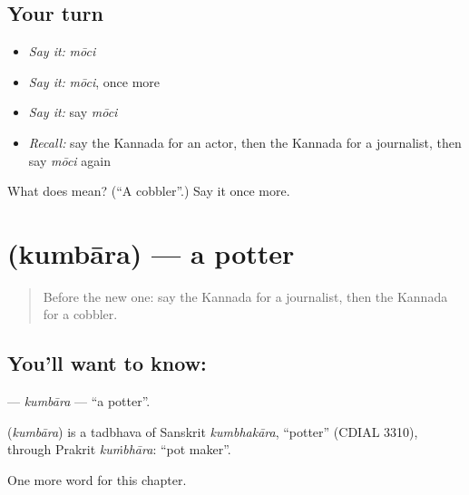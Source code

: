 \subsection*{Your turn}
\begin{itemize}
\raggedright
  \item \emph{Say it:} \emph{mōci}
  \item \emph{Say it:} \emph{mōci}, once more
  \item \emph{Say it:} say \emph{mōci}
  \item \emph{Recall:} say the Kannada for an actor, then the Kannada for a journalist, then say \emph{mōci} again
\end{itemize}

\begin{tcolorbox}[breakable,colback=teal!4,colframe=teal!35!black,title={Before you move on}]
What does  mean? (\textquotedblleft{}A cobbler\textquotedblright{}.) Say it once more.
\end{tcolorbox}
\section[\texorpdfstring{\kn{ಕುಂಬಾರ} (kumbāra)}{ಕುಂಬಾರ (kumbāra)}]{ (kumbāra) — a potter}

\label{lesson:KA-C306-kumbara}



\begin{quote}
Before the new one: say the Kannada for a journalist, then the Kannada for a cobbler.
\end{quote}

\subsection*{You'll want to know: }
\textbf{} — \emph{kumbāra} — \textquotedblleft{}a potter\textquotedblright{}.

\begin{cousinweb}
\textbf{} (\emph{kumbāra}) is a tadbhava of Sanskrit \emph{kumbhakāra}, \textquotedblleft{}potter\textquotedblright{} (CDIAL 3310), through Prakrit \emph{kuṁbhāra}: \textquotedblleft{}pot maker\textquotedblright{}.
\end{cousinweb}

\begin{grammarlens}[title={What you've built}]
One more word for this chapter.
\end{grammarlens}

